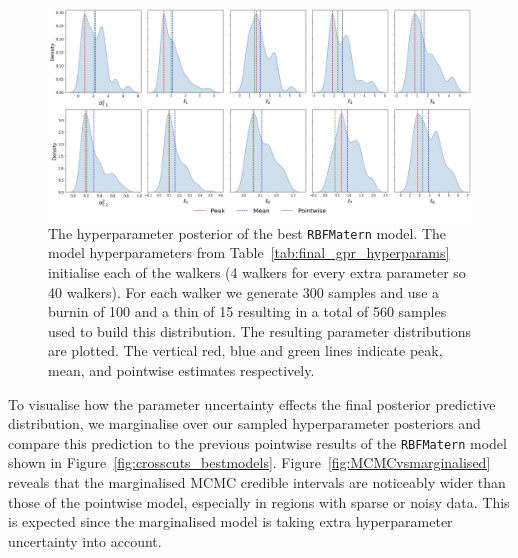 \documentclass{ucdgradtaughtthesis}
\begin{document}
\begin{figure}[H]
    \centering
    \includegraphics[width=1\textwidth]{LatexPlots/final_gps_plots/MCMCRBFMat.png}
    \caption[The hyperparameter posterior of the best \texttt{RBFMatern} model.]{The hyperparameter posterior of the best \texttt{RBFMatern} model. The model hyperparameters from Table~\ref{tab:final_gpr_hyperparams} initialise each of the walkers (4 walkers for every extra parameter so 40 walkers). For each walker we generate 300 samples and use a burnin of 100 and a thin of 15 resulting in a total of 560 samples used to build this distribution.
    The resulting parameter distributions are plotted. The vertical red, blue and green lines indicate peak, mean, and pointwise estimates respectively.}
    \label{fig:MCMCRBFMatern}
\end{figure}
To visualise how the parameter uncertainty effects the final posterior predictive distribution, we marginalise over our sampled hyperparameter posteriors and compare this prediction to the previous pointwise results of the \texttt{RBFMatern} model shown in Figure~\ref{fig:crosscuts_bestmodels}.
Figure~\ref{fig:MCMCvsmarginalised} reveals that the marginalised MCMC credible intervals are noticeably wider than those of the pointwise model, especially in regions with sparse or noisy data. This is expected since the marginalised model is taking extra hyperparameter
uncertainty into account. 
%
\end{document}
